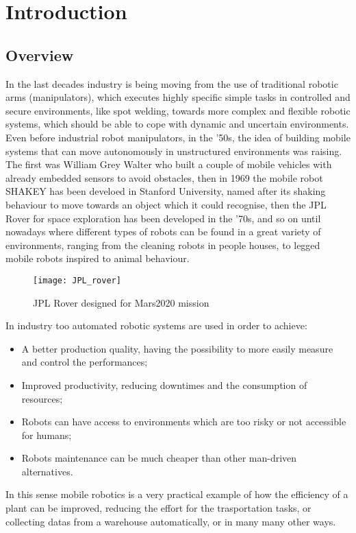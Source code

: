 \chapter{Introduction}
\label{chapter1}

\section{Overview}
In the last decades industry is being moving from the use of traditional robotic arms (manipulators), which executes highly specific simple tasks in controlled and secure environments, like spot welding, towards more complex and flexible robotic systems, which should be able to cope with dynamic and uncertain environments. \\ 
Even before industrial robot manipulators, in the '50s, the idea of building mobile systems that can move autonomously in unstructured environments was raising. The first was William Grey Walter who built a couple of mobile vehicles with already embedded sensors to avoid obstacles, then in 1969 the mobile robot SHAKEY has been develoed in Stanford University, named after its shaking behaviour to move towards an object which it could recognise, then the JPL Rover for space exploration has been developed in the '70s, and so on until nowadays where different types of robots can be found in a great variety of environments, ranging from the cleaning robots in people houses, to legged mobile robots inspired to animal behaviour.
\begin{figure}[h!]
	\centering
	\texttt{[image: JPL\_rover]}
	\caption{JPL Rover designed for Mars2020 mission}
\end{figure}
In industry too automated robotic systems are used in order to achieve:
\begin{itemize}
	\item A better production quality, having the possibility to more easily measure and control the performances;
	\item Improved productivity, reducing downtimes and the consumption of resources;
	\item Robots can have access to environments which are too risky or not accessible for humans;
	\item Robots maintenance can be much cheaper than other man-driven alternatives. 
\end{itemize}
In this sense mobile robotics is a very practical example of how the efficiency of a plant can be improved, reducing the effort for the trasportation tasks, or collecting datas from a warehouse automatically, or in many many other ways.\\
